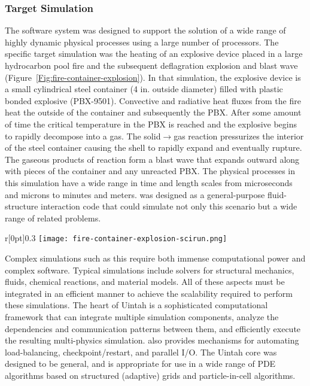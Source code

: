 \subsubsection{Target Simulation}
The \Uintah software system was designed to support the solution of a
wide range of highly dynamic physical processes using a large number
of processors.  The specific target simulation was the
heating of an explosive device placed in a large hydrocarbon pool fire
and the subsequent deflagration explosion and blast wave
(Figure~\ref{Fig:fire-container-explosion}). In that simulation, the explosive device is a
small cylindrical steel container (4 in. outside diameter) filled with
plastic bonded explosive (PBX-9501). Convective and radiative heat
fluxes from the fire heat the outside of the container and
subsequently the PBX. After some amount of time the critical
temperature in the PBX is reached and the explosive begins to rapidly
decompose into a gas. The solid$\rightarrow$gas reaction pressurizes the interior
of the steel container causing the shell to rapidly expand and
eventually rupture. The gaseous products of reaction form a blast wave
that expands outward along with pieces of the container and any
unreacted PBX. The physical processes in this simulation have a wide
range in time and length scales from microseconds and microns to
minutes and meters.  \Uintah was designed as a general-purpose
fluid-structure interaction code that could simulate not only this
scenario but a wide range of related problems.

\begin{wrapfigure}[12]{r}[0pt]{0.3\textwidth}
  \centering
  \vspace{-20pt}
  \texttt{[image: fire-container-explosion-scirun.png]}
  \caption{Target Simulation - Fire-Container-Explosion.}
  \label{Fig:fire-container-explosion}
\end{wrapfigure}

Complex simulations such as this require both immense computational
power and complex software. Typical simulations include solvers for
structural mechanics, fluids, chemical reactions, and material
models. All of these aspects must be integrated in an efficient manner
to achieve the scalability required to perform these simulations. The
heart of Uintah is a sophisticated computational framework that can
integrate multiple simulation components, analyze the dependencies and
communication patterns between them, and efficiently execute the
resulting multi-physics simulation.  \Uintah also provides mechanisms
for automating load-balancing, checkpoint/restart, and parallel
I/O. The Uintah core was designed to be general, and is appropriate
for use in a wide range of PDE algorithms based on structured
(adaptive) grids and particle-in-cell algorithms.

